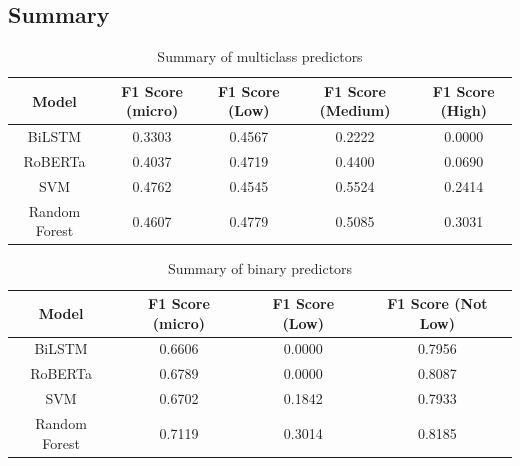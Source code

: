 \documentclass[12pt, a4paper]{article}
\begin{document}
\subsection{Summary}

\begin{table}[ht]
\centering
\begin{tabular}{||c c c c c||} 
 \hline
 Model & F1 Score (micro) & F1 Score (Low) & F1 Score (Medium) & F1 Score (High)  \\ [0.5ex] 
 \hline\hline
 BiLSTM & 0.3303 & 0.4567 & 0.2222 & 0.0000 \\ 
 RoBERTa & 0.4037 & 0.4719 & 0.4400  & 0.0690 \\
 SVM & 0.4762 & 0.4545  & 0.5524 & 0.2414\\
 Random Forest & 0.4607 & 0.4779 & 0.5085 & 0.3031 \\
 \hline
\end{tabular}

\caption{Summary of multiclass predictors}
\label{table:summary_multi}
\end{table}


\begin{table}[ht]
\centering
\begin{tabular}{||c c c c||} 
 \hline
 Model & F1 Score (micro) & F1 Score (Low) & F1 Score (Not Low) \\ [0.5ex] 
 \hline\hline
 BiLSTM & 0.6606 & 0.0000 & 0.7956 \\ 
 RoBERTa & 0.6789 & 0.0000 & 0.8087  \\
 SVM & 0.6702 & 0.1842  & 0.7933 \\
 Random Forest & 0.7119 & 0.3014 & 0.8185 \\
 \hline
\end{tabular}

\caption{Summary of binary predictors}
\label{table:summary_binaryi}
\end{table}





\end{document}
